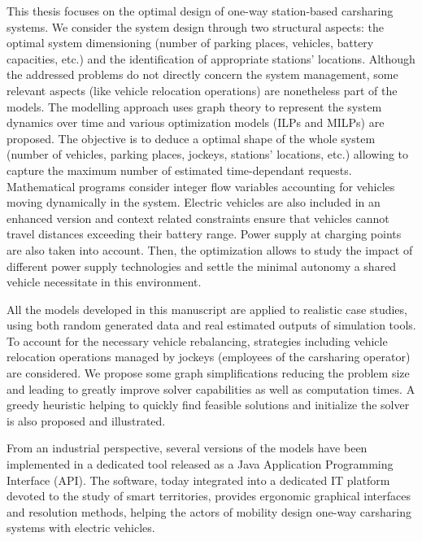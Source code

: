 \medskip
This thesis focuses on the optimal design of one-way station-based carsharing systems.
We consider the system design through two structural aspects: the optimal system dimensioning (number of parking places, vehicles, battery capacities, etc.) and the identification of appropriate stations' locations.
Although the addressed problems do not directly concern the system management, some relevant aspects (like vehicle relocation operations) are nonetheless part of the models.
The modelling approach uses graph theory to represent the system dynamics over time and various optimization models (ILPs and MILPs) are proposed.
The objective is to deduce a optimal shape of the whole system (number of vehicles, parking places, jockeys, stations' locations, etc.) allowing to capture the maximum number of estimated time-dependant requests.
Mathematical programs consider integer flow variables accounting for vehicles moving dynamically in the system.
Electric vehicles are also included in an enhanced version and context related constraints ensure that vehicles cannot travel distances exceeding their battery range.
Power supply at charging points are also taken into account.
Then, the optimization allows to study the impact of different power supply technologies and settle the minimal autonomy a shared vehicle necessitate in this environment.

\medskip
All the models developed in this manuscript are applied to realistic case studies, using both random generated data and real estimated outputs of simulation tools.
To account for the necessary vehicle rebalancing, strategies including vehicle relocation operations managed by jockeys (employees of the carsharing operator) are considered.
We propose some graph simplifications reducing the problem size and leading to greatly improve solver capabilities as well as computation times.
A greedy heuristic helping to quickly find feasible solutions and initialize the solver is also proposed and illustrated.

\medskip
From an industrial perspective, several versions of the models have been implemented in a dedicated tool released as a Java Application Programming Interface (API).
The software, today  integrated into a dedicated IT platform devoted to the study of smart territories, provides ergonomic graphical interfaces and resolution methods, helping the actors of mobility design one-way carsharing systems with electric vehicles.
